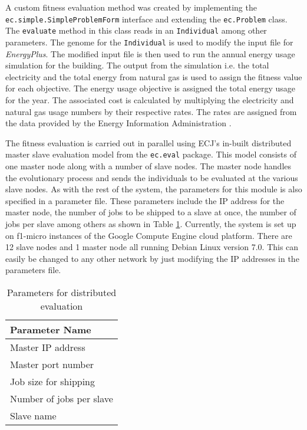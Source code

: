 A custom fitness evaluation method was created by implementing the \\
\texttt{ec.simple.SimpleProblemForm} interface and extending the \texttt{ec.Problem} class. The \texttt{evaluate} method in this class reads in an \texttt{Individual} among other parameters. The genome for the \texttt{Individual} is used to modify the input file for \textit{EnergyPlus}. The modified input file is then used to run the annual energy usage simulation for the building. The output from the simulation i.e. the total electricity and the total energy from natural gas is used to assign the fitness value for each objective. The energy usage objective is assigned the total energy usage for the year. The associated cost is calculated by multiplying the electricity and natural gas usage numbers by their respective rates. The rates are assigned from the data provided by the Energy Information Administration \cite{eia}. 

The fitness evaluation is carried out in parallel using ECJ's in-built distributed master slave evaluation model from the \texttt{ec.eval} package. This model consists of one master node along with a number of slave nodes. The master node handles the evolutionary process and sends the individuals to be evaluated at the various slave nodes. As with the rest of the system, the parameters for this module is also specified in a parameter file. These parameters include the IP address for the master node, the number of jobs to be shipped to a slave at once, the number of jobs per slave among others as shown in Table \ref{table:dist_param}. Currently, the system is set up on f1-micro instances of the Google Compute Engine cloud platform. There are 12 slave nodes and 1 master node all running Debian Linux version 7.0. This can easily be changed to any other network by just modifying the IP addresses in the parameters file.

\begin{table}[htbp]
    \centering
    \begin{tabular}{|l|}
    \hline
    Parameter Name                  \\ \hline
    Master IP address               \\
    Master port number               \\
    Job size for shipping             \\
    Number of jobs per slave           \\
    Slave name              \\ \hline
    \end{tabular}
    \caption{Parameters for distributed evaluation}
    \label{table:dist_param}
\end{table}


